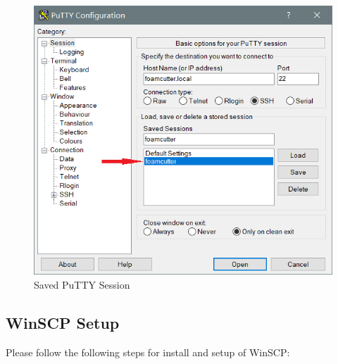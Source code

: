 \documentclass[titlepage,10pt,letter]{report}
\numberwithin{equation}{chapter}
\begin{document}
\begin{enumerate}[noitemsep,topsep=0pt]
	\begin{figure} [H]
		\includegraphics[width = 0.6\linewidth]{./Figures/Laptop_Setup/putty3.png}
		\caption{Saved PuTTY Session}
		\label{fig:putty3}
	\end{figure}
\end{enumerate}

\subsection{WinSCP Setup}

\noindent Please follow the following steps for install and setup of WinSCP:
\end{document}
